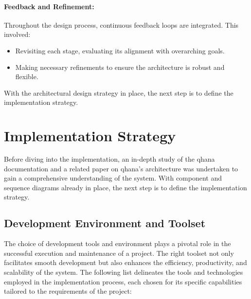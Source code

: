 \documentclass[
  a4paper,  %
  twoside,  %
  bibliography=totoc,
  headsepline,
  cleardoublepage=empty,
  parskip=half,
  draft=false
]{scrbook}
\begin{document}
\paragraph{Feedback and Refinement:}
Throughout the design process, continuous feedback loops are integrated. This involved:
\begin{itemize}
\item Revisiting each stage, evaluating its alignment with overarching goals.
\item Making necessary refinements to ensure the architecture is robust and flexible.
\end{itemize}

With the architectural design strategy in place, the next step is to define the implementation strategy.

\section{Implementation Strategy}
\label{sec:implementationStrategy}

Before diving into the implementation, an in-depth study of the \gls{qhana} documentation \cite{FabianBuehler} and a related paper on \gls{qhana}'s architecture \cite{Buehler2022} was undertaken to gain a comprehensive understanding of the system.
With component and sequence diagrams already in place, the next step is to define the implementation strategy.

\subsection{Development Environment and Toolset}

The choice of development tools and environment plays a pivotal role in the successful execution and maintenance of a project.
The right toolset not only facilitates smooth development but also enhances the efficiency, productivity, and scalability of the system.
The following list delineates the tools and technologies employed in the implementation process, each chosen for its specific capabilities tailored to the requirements of the project:
\end{document}

